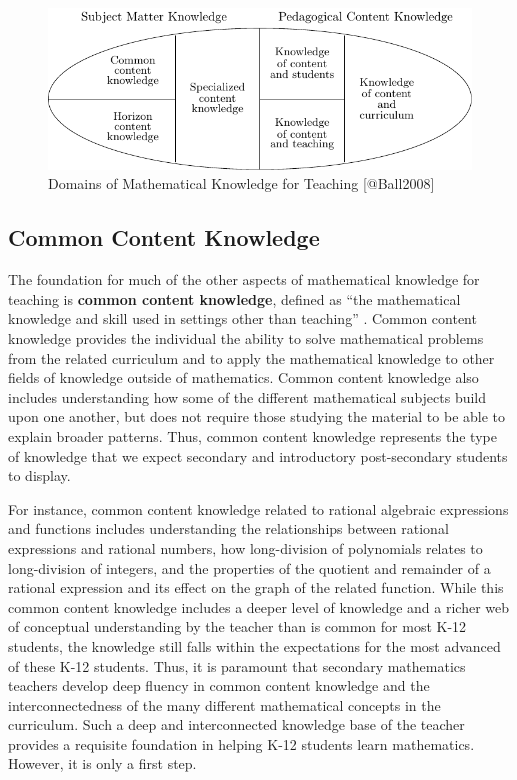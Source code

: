 \documentclass[
]{book}
\theoremstyle{definition}
\theoremstyle{definition}
\theoremstyle{definition}
\theoremstyle{remark}
\begin{document}
\begin{figure}

{\centering \includegraphics[width=1\linewidth]{tikz/ballegg1} 

}

\caption{Domains of Mathematical Knowledge for Teaching [@Ball2008]}\label{fig:unnamed-chunk-3}
\end{figure}

\hypertarget{common-content-knowledge}{%
\subsection{Common Content Knowledge}\label{common-content-knowledge}}

The foundation for much of the other aspects of mathematical knowledge for teaching is \textbf{common content knowledge}, defined as ``the mathematical knowledge and skill used in settings other than teaching'' \citep[p.~399]{Ball2008}. Common content knowledge provides the individual the ability to solve mathematical problems from the related curriculum and to apply the mathematical knowledge to other fields of knowledge outside of mathematics. Common content knowledge also includes understanding how some of the different mathematical subjects build upon one another, but does not require those studying the material to be able to explain broader patterns. Thus, common content knowledge represents the type of knowledge that we expect secondary and introductory post-secondary students to display.

For instance, common content knowledge related to rational algebraic expressions and functions includes understanding the relationships between rational expressions and rational numbers, how long-division of polynomials relates to long-division of integers, and the properties of the quotient and remainder of a rational expression and its effect on the graph of the related function. While this common content knowledge includes a deeper level of knowledge and a richer web of conceptual understanding by the teacher than is common for most K-12 students, the knowledge still falls within the expectations for the most advanced of these K-12 students. Thus, it is paramount that secondary mathematics teachers develop deep fluency in common content knowledge and the interconnectedness of the many different mathematical concepts in the curriculum. Such a deep and interconnected knowledge base of the teacher provides a requisite foundation in helping K-12 students learn mathematics. However, it is only a first step.
\end{document}
